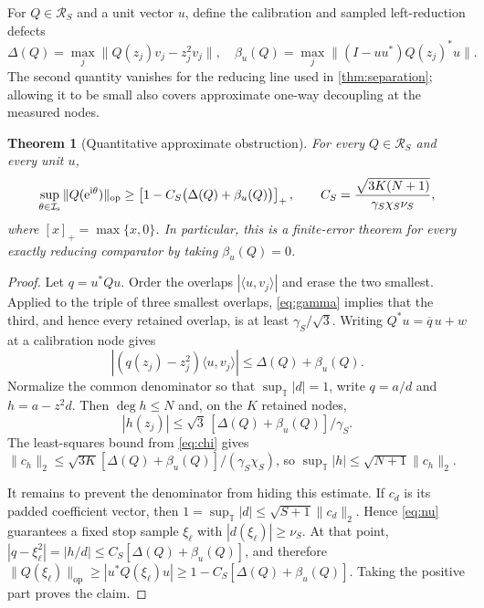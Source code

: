 \documentclass[11pt]{article}
\newtheorem{theorem}{Theorem}[section]
\theoremstyle{definition}
\theoremstyle{remark}
\newcommand{\T}{\mathbb{T}}
\newcommand{\cR}{\mathcal{R}}
\newcommand{\cI}{\mathcal{I}}
\newcommand{\op}{\mathrm{op}}
\newcommand{\e}{\mathrm{e}}
\begin{document}
For $Q\in\cR_S$ and a unit vector $u$, define the calibration and sampled
left-reduction defects
\begin{equation}\label{eq:defects}
 \Delta(Q)=\max_j\|Q(z_j)v_j-z_j^2v_j\|,
 \quad
 \beta_u(Q)=\max_j\|(I-uu^*)Q(z_j)^*u\|.
\end{equation}
The second quantity vanishes for the reducing line used in
\cref{thm:separation}; allowing it to be small also covers approximate
one-way decoupling at the measured nodes.

\begin{theorem}[Quantitative approximate obstruction]\label{thm:robust}
For every $Q\in\cR_S$ and every unit $u$,
\begin{equation}\label{eq:robustlb}
 \sup_{\theta\in\cI_{\rm s}}\|Q(\e^{\mathrm{i}\theta})\|_{\op}
 \geq
 \left[1-C_S\bigl(\Delta(Q)+\beta_u(Q)\bigr)\right]_+,
 \qquad
 C_S=\frac{\sqrt{3K(N+1)}}{\gamma_S\chi_S\nu_S},
\end{equation}
where $[x]_+=\max\{x,0\}$.  In particular, this is a finite-error theorem
for every exactly reducing comparator by taking $\beta_u(Q)=0$.
\end{theorem}

\begin{proof}
Let $q=u^*Qu$.  Order the overlaps $|\langle u,v_j\rangle|$ and erase the
two smallest.  Applied to the triple of three smallest overlaps,
\eqref{eq:gamma} implies that the third, and hence every retained overlap, is
at least $\gamma_S/\sqrt3$.  Writing
$Q^*u=\overline q\,u+w$ at a calibration node gives
\[
 |(q(z_j)-z_j^2)\langle u,v_j\rangle|
 \leq\Delta(Q)+\beta_u(Q).
\]
Normalize the common denominator so that $\sup_\T|d|=1$, write $q=a/d$ and
$h=a-z^2d$.  Then $\deg h\leq N$ and, on the $K$ retained nodes,
\[
 |h(z_j)|\leq\sqrt3\,[\Delta(Q)+\beta_u(Q)]/\gamma_S.
\]
The least-squares bound from \eqref{eq:chi} gives
$\|c_h\|_2\leq\sqrt{3K}[\Delta(Q)+\beta_u(Q)]/(\gamma_S\chi_S)$, so
$\sup_\T|h|\leq\sqrt{N+1}\|c_h\|_2$.

It remains to prevent the denominator from hiding this estimate.  If $c_d$
is its padded coefficient vector, then
$1=\sup_\T|d|\leq\sqrt{S+1}\|c_d\|_2$.  Hence \eqref{eq:nu} guarantees a
fixed stop sample $\xi_\ell$ with $|d(\xi_\ell)|\geq\nu_S$.  At that point,
$|q-\xi_\ell^2|=|h/d|\leq C_S[\Delta(Q)+\beta_u(Q)]$, and therefore
$\|Q(\xi_\ell)\|_{\op}\geq|u^*Q(\xi_\ell)u|
\geq1-C_S[\Delta(Q)+\beta_u(Q)]$.
Taking the positive part proves the claim.
\end{proof}
\end{document}
